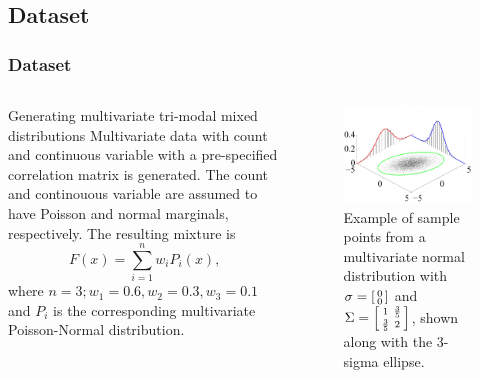 \documentclass{beamer}\usepackage[]{graphicx}\usepackage[]{color}
\begin{document}
\subsection{Dataset}
\begin{frame}[fragile]
\frametitle{Dataset}
\small
\begin{columns}[c] %
\centering
\begin{block}{Generating multivariate tri-modal mixed distributions}
Multivariate data with count and continuous variable with a pre-specified correlation matrix is generated. The count and continouous variable are assumed to have Poisson and normal marginals, respectively. The resulting mixture is
\centering
\begin{equation*}
F(x) =  \sum_{i=1}^{n}  w_i P_i(x),
\end{equation*}
where $n = 3;w_1 = 0.6, w_2 = 0.3, w_3 = 0.1$ and $P_i$ is the corresponding multivariate Poisson-Normal distribution.
\end{block}
\centering
\begin{figure}
	\includegraphics[width=0.75\linewidth]{multivariate_normal_sample.png}
	\caption{\small Example of sample points from a multivariate normal distribution with $\sigma = \begin{bsmallmatrix} 0 \\ 0 \end{bsmallmatrix}$ and $\Sigma = \begin{bsmallmatrix}1 & \frac{3}{5}\\ \frac{3}{5} & 2\end{bsmallmatrix}$, shown along with the 3-sigma ellipse.\footnotemark[4]}
\end{figure}
\end{columns}
\end{frame}
\end{document}
